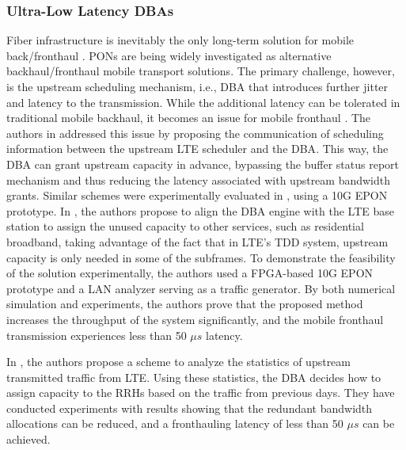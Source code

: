 \subsubsection{Ultra-Low Latency \acp{DBA}}

Fiber infrastructure is inevitably the only long-term solution for mobile back/fronthaul \cite{6461186}. \acp{PON} are being widely investigated as alternative backhaul/fronthaul mobile transport solutions. The primary challenge, however, is the upstream scheduling mechanism, i.e., \ac{DBA} that introduces further jitter and latency to the transmission. While the additional latency can be tolerated in traditional mobile backhaul, it becomes an issue for mobile fronthaul \cite{6886953}.
The authors in \cite{6886953} addressed this issue by proposing the communication of scheduling information between the upstream \ac{LTE} scheduler and the \ac{DBA}. This way, the \ac{DBA} can grant upstream capacity in advance, bypassing the buffer status report mechanism and thus reducing the latency associated with upstream bandwidth grants. Similar schemes were experimentally evaluated in \cite{7936876}, using a 10G \ac{EPON} prototype.
In \cite{Hisano2016icc, Hisano2016ecoc}, the authors propose to align the \ac{DBA} engine with the \ac{LTE} base station to assign the unused capacity to other services, such as residential broadband, taking advantage of the fact that in \ac{LTE}'s \ac{TDD} system, upstream capacity is only needed in some of the subframes. To demonstrate the feasibility of the solution experimentally, the authors used a \ac{FPGA}-based 10G \ac{EPON} prototype and a \ac{LAN} analyzer serving as a traffic generator. By both numerical simulation and experiments, the authors prove that the proposed method increases the throughput of the system significantly, and the mobile fronthaul transmission experiences less than 50 $\mu s$ latency.

In \cite{Kobayashi2016}, the authors propose a scheme to analyze the statistics of upstream transmitted traffic from \ac{LTE}. Using these statistics, the \ac{DBA} decides how to assign capacity to the \acp{RRH} based on the traffic from previous days. They have conducted experiments with results showing that the redundant bandwidth allocations can be reduced, and a fronthauling latency of less than 50 $\mu s$ can be achieved.
